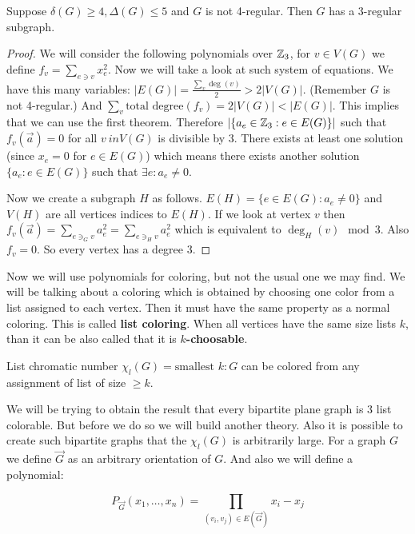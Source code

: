\begin{thm}
	Suppose $\delta(G) \geq 4, \Delta(G) \leq 5$ and $G$ is not 4-regular. Then $G$ has a $3$-regular subgraph.
\end{thm}

\begin{proof}
	We will consider the following polynomials over $\mathbb{Z}_{3}$, for $v \in V(G)$ we define $f_{v} = \sum_{e \ni v} x_{e}^{2}$. Now we will take a look at such system of equations. We have this many variables: $|E(G)| = \frac{\sum_{v} \deg(v)}{2} > 2|V(G)|$. (Remember $G$ is not 4-regular.) And $\sum_{v} \text{total degree}(f_v) = 2|V(G)| < |E(G)|$. This implies that we can use the first theorem. Therefore $|\{a_{e} \in \mathbb{Z}_{3} : e \in E(G)\}|$ such that $f_{v}(\overrightarrow{a}) =0$ for all $v \ in V(G)$ is divisible by 3. There exists at least one solution (since $x_{e} = 0$ for $e \in E(G)$) which means there exists another solution $\{a_{e} : e \in E(G)\}$ such that $\exists e : a_{e} \neq 0$.
	
	Now we create a subgraph $H$ as follows. $E(H) = \{e \in E(G) : a_{e} \neq 0\}$ and $V(H)$ are all vertices indices to $E(H)$. If we look at vertex $v$ then $f_{v}(\overrightarrow{a}) = \sum_{e \ni_{G} v} a_{e}^{2} = \sum_{e \ni_{H} v} a_{e}^{2}$ which is equivalent to $\deg_{H}(v) \mod 3$. Also $f_{v} = 0$. So every vertex has a degree 3.
\end{proof}

Now we will use polynomials for coloring, but not the usual one we may find. We will be talking about a coloring which is obtained by choosing one color from a list assigned to each vertex. Then it must have the same property as a normal coloring. This is called \textbf{list coloring}. When all vertices have the same size lists $k$, than it can be also called that it is \textbf{$k$-choosable}.

\begin{defn}
	List chromatic number $\chi_{l}(G) = \text{smallest } k : G$ can be colored from any assignment of list of size $\geq k$.
\end{defn}

We will be trying to obtain the result that every bipartite plane graph is $3$ list colorable. But before we do so we will build another theory. Also it is possible to create such bipartite graphs that the $\chi_{l}(G)$ is arbitrarily large. For a graph $G$ we define $\overrightarrow{G}$ as an arbitrary orientation of $G$. And also we will define a polynomial:

$$
P_{\overrightarrow{G}} (x_{1}, \dots, x_{n}) = \prod_{(v_{i},v_{j}) \in E(\overrightarrow{G})} x_{i} - x_{j}
$$

